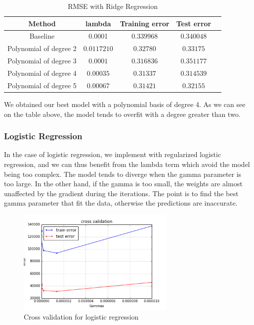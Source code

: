 \documentclass[10pt,conference,compsocconf]{IEEEtran}
\begin{document}
\begin{table}[!h]
\begin{center}
\begin{tabular}{|c||c|c|c|c|}
    \hline
    Method & lambda & Training error & Test error  \\
    \hline\hline
    Baseline & 0.0001 & $0.339968$ & $0.340048$ \\
    \hline
    Polynomial of degree 2& $0.0117210$ &$0.32780$ & $0.33175$ \\
    \hline
    Polynomial of degree 3& $0.0001$ &$0.316836$&$0.351177$ \\
    \hline
    Polynomial of degree 4& $0.00035$ &$0.31337$&$0.314539$ \\
    \hline
    Polynomial of degree 5& $0.00067$ &$0.31421$&$0.32155$ \\
    \hline
\end{tabular}
\caption{RMSE with Ridge Regression}
\label{table:ridgeTable}
\end{center}
\end{table}

We obtained our best model with a polynomial basis of degree 4. As we can see on the table above, the model tends to overfit with a degree greater than two.

\subsubsection{Logistic Regression}

In the case of logistic regression, we implement with regularized logistic regression, and we can thus benefit from the lambda term which avoid the model being too complex. The model tends to diverge when the gamma parameter is too large. In the other hand, if the gamma is too small, the weights are almost unaffected by the gradient during the iterations. The point is to find the best gamma parameter that fit the data, otherwise the predictions are inaccurate.

\begin{figure}[!h]
    \centering
    \includegraphics[width=3in]{figures/cross_validation_logistic}
    \caption{Cross validation for logistic regression}
    \label{fig:my_label}
\end{figure}
\end{document}
